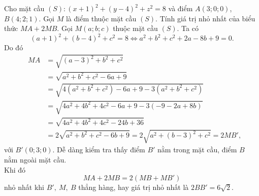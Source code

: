\begin{vd}%
Cho mặt cầu $(S)\colon(x+1)^2+(y-4)^2+z^2=8$ và điểm $A(3;0;0)$, $B(4;2;1)$. Gọi $M$ là điểm thuộc mặt cầu $(S)$. Tính giá trị nhỏ nhất của biểu thức $MA+2MB$.
\loigiai
{
Gọi $M(a;b;c)$ thuộc mặt cầu $(S)$. Ta có
\[(a+1)^2+(b-4)^2+c^2=8\Leftrightarrow a^2+b^2+c^2+2a-8b+9=0.\]
Do đó
\allowdisplaybreaks
\begin{eqnarray*}
&MA&=\sqrt{(a-3)^2+b^2+c^2}\\
& &=\sqrt{a^2+b^2+c^2-6a+9} \\
& &=\sqrt{4(a^2+b^2+c^2)-6a+9-3(a^2+b^2+c^2)}\\
& &=\sqrt{4a^2+4b^2+4c^2-6a+9-3(-9-2a+8b)}\\
& &=\sqrt{4a^2+4b^2+4c^2-24b+36}\\
& &=2\sqrt{a^2+b^2+c^2-6b+9}=2\sqrt{a^2+(b-3)^2+c^2}=2MB',
\end{eqnarray*}
với $B'(0;3;0)$. Dễ dàng kiểm tra thấy điểm $B'$ nằm trong mặt cầu, điểm $B$ nằm ngoài mặt cầu.\\
Khi đó
\[MA+2MB=2(MB+MB')\]
nhỏ nhất khi $B',~M,~B$ thẳng hàng, hay giá trị nhỏ nhất là $2BB'=6\sqrt{2}$.
}
\end{vd}
